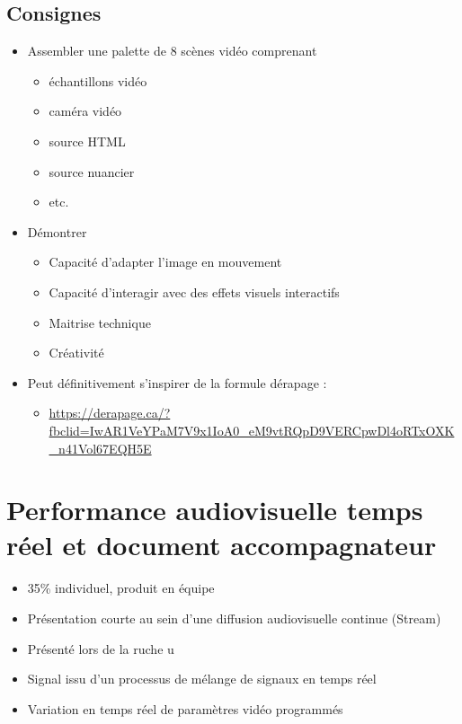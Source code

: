 \documentclass[
]{book}
\providecommand{\tightlist}{%
  \setlength{\itemsep}{0pt}\setlength{\parskip}{0pt}}
\begin{document}
\hypertarget{consignes-3}{%
\subsection{Consignes}\label{consignes-3}}

\begin{itemize}
\tightlist
\item
  Assembler une palette de 8 scènes vidéo comprenant

  \begin{itemize}
  \tightlist
  \item
    échantillons vidéo
  \item
    caméra vidéo
  \item
    source HTML
  \item
    source nuancier
  \item
    etc.
  \end{itemize}
\item
  Démontrer

  \begin{itemize}
  \tightlist
  \item
    Capacité d'adapter l'image en mouvement
  \item
    Capacité d'interagir avec des effets visuels interactifs
  \item
    Maitrise technique
  \item
    Créativité
  \end{itemize}
\item
  Peut définitivement s'inspirer de la formule dérapage :

  \begin{itemize}
  \tightlist
  \item
    \url{https://derapage.ca/?fbclid=IwAR1VeYPaM7V9x1IoA0_eM9vtRQpD9VERCpwDl4oRTxOXK_n41Vol67EQH5E}
  \end{itemize}
\end{itemize}

\hypertarget{sommatif_5}{%
\section{Performance audiovisuelle temps réel et document accompagnateur}\label{sommatif_5}}

\begin{itemize}
\tightlist
\item
  35\% individuel, produit en équipe
\item
  Présentation courte au sein d'une diffusion audiovisuelle continue (Stream)
\item
  Présenté lors de la ruche u
\item
  Signal issu d'un processus de mélange de signaux en temps réel
\item
  Variation en temps réel de paramètres vidéo programmés
\end{itemize}
\end{document}
